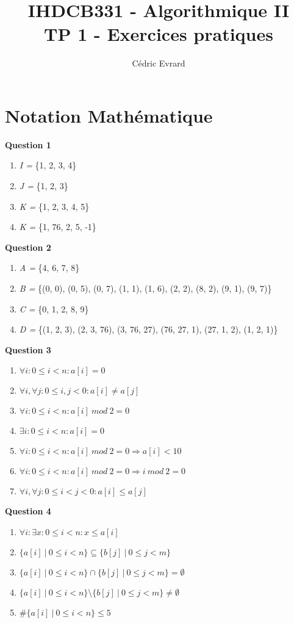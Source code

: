 \documentclass[11pt]{article}
\title{IHDCB331 - Algorithmique II\\
	\large{TP 1 - Exercices pratiques}
}
\author{Cédric Evrard}
\begin{document}
\maketitle

\section{Notation Mathématique}

\textbf{Question 1}
\begin{enumerate}
	\item \textit{I =} \{1, 2, 3, 4\}
	\item \textit{J =} \{1, 2, 3\} 
	\item \textit{K =} \{1, 2, 3, 4, 5\}
	\item \textit{K =} \{1, 76, 2, 5, -1\} 
\end{enumerate}
\textbf{Question 2}
\begin{enumerate}
	\item \textit{A =} \{4, 6, 7, 8\}
	\item \textit{B =} \{(0, 0), (0, 5), (0, 7), (1, 1), (1, 6), (2, 2), (8, 2), (9, 1), (9, 7)\}
	\item \textit{C =} \{0, 1, 2, 8, 9\}
	\item \textit{D =} \{(1, 2, 3), (2, 3, 76), (3, 76, 27), (76, 27, 1), (27, 1, 2), (1, 2, 1)\}
\end{enumerate}
\textbf{Question 3}
\begin{enumerate}
	\item $\forall i : 0 \leq i < n : a[i] = 0$
	\item $\forall i, \forall j : 0 \leq i, j < 0 : a[i] \neq a[j]$
	\item $\forall i : 0 \leq i < n : a[i]\ mod\ 2 = 0$
	\item $\exists i : 0 \leq i < n : a[i] = 0$
	\item $\forall i : 0 \leq i < n : a[i]\ mod\ 2 = 0 \Rightarrow a[i] < 10  $
	\item $\forall i : 0 \leq i < n : a[i]\ mod\ 2 = 0 \Rightarrow i\ mod\ 2 = 0$
	\item $\forall i, \forall j : 0 \leq i < j < 0 : a[i] \leq a[j]$
\end{enumerate}
\textbf{Question 4}
\begin{enumerate}
	\item $\forall i : \exists x : 0 \leq i < n : x \leq a[i] $ 
	\item $\{a[i]\ |\ 0 \leq i < n \} \subseteq \{b[j]\ |\ 0 \leq j < m \}$
	\item $\{a[i]\ |\ 0 \leq i < n \} \cap \{b[j]\ |\ 0 \leq j < m \} = \emptyset$  
	\item $\{a[i]\ |\ 0 \leq i < n \} \setminus \{b[j]\ |\ 0 \leq j < m \} \neq \emptyset$ 
	\item $\#\{a[i]\ |\ 0 \leq i < n \} \leq 5$
\end{enumerate}
\end{document}
